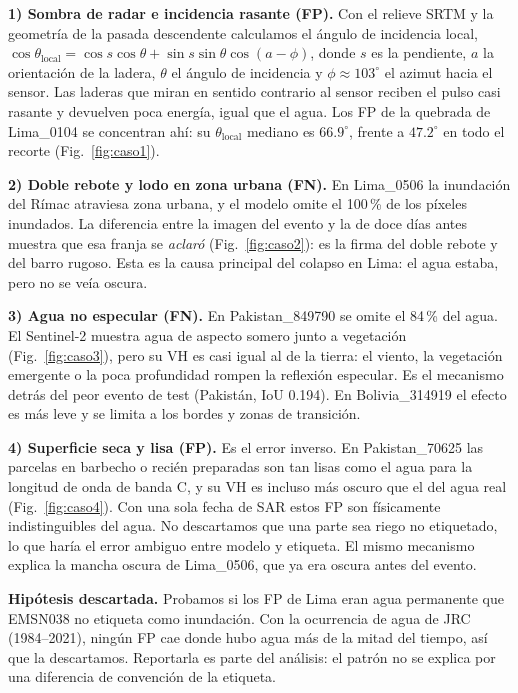 \textbf{1) Sombra de radar e incidencia rasante (FP).} Con el relieve SRTM y la geometría de la
pasada descendente calculamos el ángulo de incidencia local,
$\cos\theta_{\text{local}}=\cos s\cos\theta+\sin s\sin\theta\cos(a-\phi)$, donde $s$ es la
pendiente, $a$ la orientación de la ladera, $\theta$ el ángulo de incidencia y
$\phi\approx103^\circ$ el azimut hacia el sensor. Las laderas que miran en sentido contrario al
sensor reciben el pulso casi rasante y devuelven poca energía, igual que el agua. Los FP de la
quebrada de Lima\_0104 se concentran ahí: su $\theta_{\text{local}}$ mediano es $66.9^\circ$,
frente a $47.2^\circ$ en todo el recorte (Fig.~\ref{fig:caso1}).

\textbf{2) Doble rebote y lodo en zona urbana (FN).} En Lima\_0506 la inundación del Rímac
atraviesa zona urbana, y el modelo omite el 100\,\% de los píxeles inundados. La diferencia
entre la imagen del evento y la de doce días antes muestra que esa franja se \emph{aclaró}
(Fig.~\ref{fig:caso2}): es la firma del doble rebote y del barro rugoso. Esta es la causa
principal del colapso en Lima: el agua estaba, pero no se veía oscura.

\textbf{3) Agua no especular (FN).} En Pakistan\_849790 se omite el 84\,\% del agua. El Sentinel-2
muestra agua de aspecto somero junto a vegetación (Fig.~\ref{fig:caso3}), pero su VH es casi igual al de la
tierra: el viento, la vegetación emergente o la poca profundidad rompen la reflexión
especular. Es el mecanismo detrás del peor evento de test (Pakistán, IoU 0.194). En Bolivia\_314919 el
efecto es más leve y se limita a los bordes y zonas de transición.

\textbf{4) Superficie seca y lisa (FP).} Es el error inverso. En Pakistan\_70625 las parcelas en
barbecho o recién preparadas son tan lisas como el agua para la longitud de onda de banda C, y
su VH es incluso más oscuro que el del agua real (Fig.~\ref{fig:caso4}). Con una sola fecha de
SAR estos FP son físicamente indistinguibles del agua. No descartamos que una parte sea riego
no etiquetado, lo que haría el error ambiguo entre modelo y etiqueta. El mismo mecanismo
explica la mancha oscura de Lima\_0506, que ya era oscura antes del evento.

\textbf{Hipótesis descartada.} Probamos si los FP de Lima eran agua permanente que EMSN038 no
etiqueta como inundación. Con la ocurrencia de agua de JRC (1984--2021), ningún FP cae donde
hubo agua más de la mitad del tiempo, así que la descartamos. Reportarla es parte del análisis:
el patrón no se explica por una diferencia de convención de la etiqueta.

